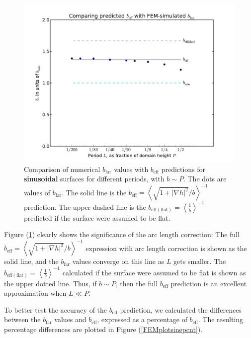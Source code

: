 \documentclass[12pt, a4paper, twoside, openright]{book}
\newcommand{\beff}{\ensuremath{b_{\mathrm{eff}}}}
\newcommand{\bfar}{\ensuremath{b_{\mathrm{far}}}}
\newcommand{\beffhf}{\ensuremath{b_{\mathrm{eff (flat)}}} = \left< \frac{1}{b} \right>^{-1} }
\newcommand{\beffha}{\ensuremath{b_{\mathrm{eff}}} = \left< \sqrt{1 + |\nabla h|^2} / {b} \right>^{-1} }
\begin{document}
\begin{figure}[ht]
\includegraphics[scale=0.595]{Lund_Thesis_FEM_plot_sine}
\caption{Comparison of numerical $\bfar$ values with $\beff$ predictions for \textbf{sinusoidal} surfaces for different periods, with $b\sim P$. The dots are values of $\bfar$. The solid line is the  $\beffha$ prediction.  The upper dashed line is the $\beffhf$ predicted if the surface were assumed to be flat.}\label{FEMplotsine}
\end{figure}

Figure (\ref{FEMplotsine}) clearly shows the significance of the arc length correction: The full $\beffha$ expression with arc length correction is shown as the solid line, and the $\bfar$ values converge on this line as $L$ gets smaller. The $\beffhf$ calculated if the surface were assumed to be flat is shown as the upper dotted line.  Thus, if $b\sim P$, then the full $\beff$ prediction is an excellent approximation when $L \ll P$.

To better test the accuracy of the $\beff$ prediction, we calculated the differences between the $\bfar$ values and $\beff$, expressed as a percentage of $\beff$.  The resulting percentage differences are plotted in Figure (\ref{FEMplotsinepcnt}). 
\end{document}
